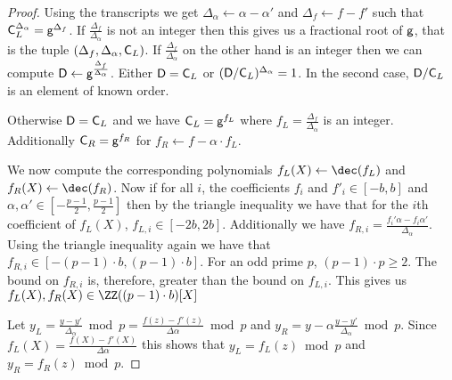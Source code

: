 \begin{proof}
	Using the transcripts we get $\Delta_\alpha\gets\alpha-\alpha'$ and $\Delta_f\gets f-f'$ such that $\mathsf{C}_{L}^{\Delta_\alpha}=\mathsf{g}^{\Delta_f}$. 
 If $\frac{\Delta_f}{\Delta_\alpha}$ is not an integer then this gives us a fractional root of $\mathsf{g}$, that is the tuple $(\Delta_f,\Delta_\alpha,\mathsf{C}_{L})$.  
 If $\frac{\Delta_f}{\Delta_\alpha}$ on the other hand is an integer then we can compute $\mathsf{D}\gets\mathsf{g}^{\frac{\Delta_f}{\Delta_\alpha}}$. Either $\mathsf{D}=\mathsf{C}_{L}$ or $(\mathsf{D}/\mathsf{C}_{L})^{\Delta_\alpha}=1$. In the second case, $\mathsf{D}/\mathsf{C}_{L}$ is an element of known order.
   
  Otherwise $\mathsf{D} = \mathsf{C}_L$ and we have $\mathsf{C}_{L}=\mathsf{g}^{f_L}$ where $f_L=\frac{\Delta_f}{\Delta_\alpha}$ is an integer.
Additionally $\mathsf{C}_R=\mathsf{g}^{f_R}$ for $f_R\gets f-\alpha \cdot f_L$.

We now compute the corresponding polynomials $f_L(X)\gets \dec(f_L)$ and $f_R(X)\gets \dec(f_R)$.
Now if for all $i$, the coefficients $f_i$ and $f'_i\in [-b,b]$ and $\alpha,\alpha' \in [-\frac{p-1}{2},\frac{p-1}{2}]$ then by the triangle inequality we have that for the $i$th coefficient of $f_L(X)$, $f_{L,i}\in [-2b,2b]$. Additionally we have $f_{R,i}=\frac{f_i'\alpha-f_i \alpha'}{\Delta_\alpha}$. Using the triangle inequality again we have that $f_{R,i} \in [-(p-1) \cdot b, (p-1) \cdot b]$. For an odd prime $p$, $(p-1)\cdot p\geq 2$. The bound on $f_{R,i}$ is, therefore, greater than the bound on $f_{L,i}$. This gives us $f_L(X),f_R(X)\in \ZZ({(p-1) \cdot b})[X]$

Let $y_L=\frac{y-y'}{\Delta_\alpha} \bmod p=\frac{f(z)-f'(z)}{\Delta \alpha} \bmod p$ and $y_R= y-\alpha\frac{y-y'}{\Delta_\alpha} \bmod p$. Since $f_L(X)=\frac{f(X)-f'(X)}{\Delta \alpha}$ this shows that $y_L=f_L(z)\bmod p$ and $y_R=f_R(z)\bmod p$.
\end{proof}

\def\thetheorem{\ref{thm:polycommitsecurity}}
\begin{theorem}
\maintheorem
\end{theorem}




